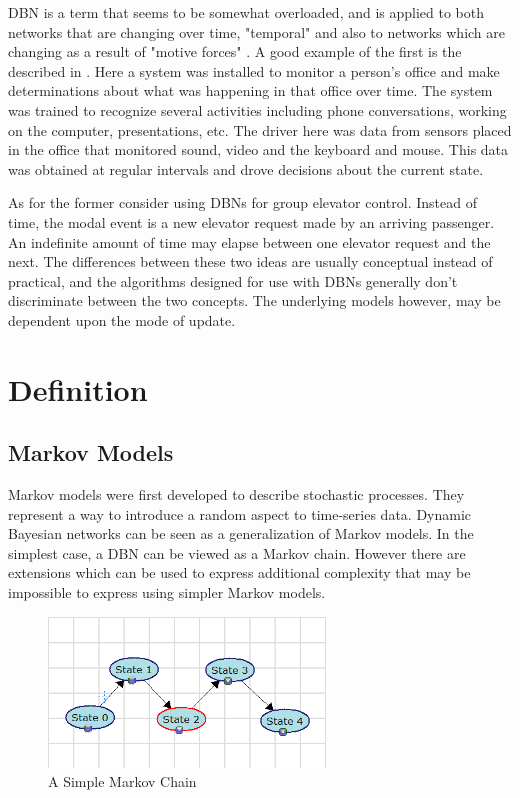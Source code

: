 \documentclass{article}
\begin{document}
DBN is a term that seems to be somewhat overloaded, and is applied to both networks that are changing over time, "temporal" and also to networks which are changing as a result of "motive forces" \cite{sterritt00exploring}. A good example of the first is the described in \cite{oliverOffice}. Here a system was installed to monitor a person's office and make determinations about what was happening in that office over time. The system was trained to recognize several activities including phone conversations, working on the computer, presentations, etc. The driver here was data from sensors placed in the office that monitored sound, video and the keyboard and mouse. This data was obtained at regular intervals and drove decisions about the current state. 

As for the former \cite{group-model} consider using DBNs for group elevator control. Instead of time, the modal event is a new elevator request made by an arriving passenger. An indefinite amount of time may elapse between one elevator request and the next. The differences between these two ideas are usually conceptual instead of practical, and the algorithms designed for use with DBNs generally don't discriminate between the two concepts. The underlying models however, may be dependent upon the mode of update.  

\section {Definition}
\subsection{Markov Models}
Markov models were first developed to describe stochastic processes. They represent a way to introduce a random aspect to time-series data. Dynamic Bayesian networks can be seen as a generalization of Markov models. In the simplest case, a DBN can be viewed as a Markov chain. However there are extensions which can be used to express additional complexity that may be impossible to express using simpler Markov models.

\begin{figure}[h]
\begin{center}
\includegraphics[height=40mm]{figures/simplemarkovmodel.png}
\caption{A Simple Markov Chain}
\label{fig:simplemarkovmodel}
\end{center}
\end{figure}
\end{document}
